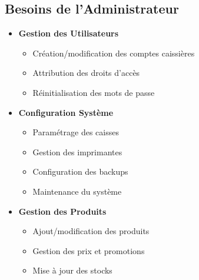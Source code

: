 \documentclass[14pt,a4paper]{report}
\begin{document}
\subsection{Besoins de l'Administrateur}
\begin{itemize}
    \item \textbf{Gestion des Utilisateurs}
        \begin{itemize}
            \item Création/modification des comptes caissières
            \item Attribution des droits d'accès
            \item Réinitialisation des mots de passe
        \end{itemize}
    \item \textbf{Configuration Système}
        \begin{itemize}
            \item Paramétrage des caisses
            \item Gestion des imprimantes
            \item Configuration des backups
            \item Maintenance du système
        \end{itemize}
    \item \textbf{Gestion des Produits}
        \begin{itemize}
            \item Ajout/modification des produits
            \item Gestion des prix et promotions
            \item Mise à jour des stocks
        \end{itemize}
\end{itemize}
\end{document}
